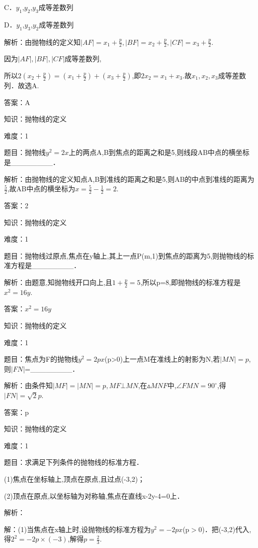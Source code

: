 \documentclass{article} %
\begin{document}
C．$y_{1}$,$y_{2}$,$y_{3}$成等差数列

D．$y_{1}$,$y_{3}$,$y_{2}$成等差数列

解析：由抛物线的定义知$|AF|=x_1+\frac{p}{2},|BF|=x_2+\frac{p}{2},|CF|=x_3+\frac{p}{2}$.

因为$|AF|,|BF|,|CF|$成等差数列,

所以$2(x_2+\frac{p}{2})=(x_1+\frac{p}{2})+(x_3+\frac{p}{2})$,即$2x_{2}=x_{1}+x_{3}$.故$x_{1},x_{2},x_{3}$成等差数列．故选A.

答案：A



知识：抛物线的定义

难度：1

题目：抛物线$y^{2}=2x$上的两点A,B到焦点的距离之和是5,则线段AB中点的横坐标是\_\_\_\_\_\_\_\_．

解析：由抛物线的定义知点A,B到准线的距离之和是5,则AB的中点到准线的距离为$\frac{5}{2}$,故AB中点的横坐标为$x=\frac{5}{2}-\frac{1}{2}=2$.

答案：2



知识：抛物线的定义

难度：1

题目：抛物线过原点,焦点在y轴上,其上一点P(m,1)到焦点的距离为5,则抛物线的标准方程是\_\_\_\_\_\_\_\_．

解析：由题意,知抛物线开口向上,且$1+\frac{p}{2}=5$,所以p=8,即抛物线的标准方程是$x^{2}=16y$.

答案：$x^{2}=16y$



知识：抛物线的定义

难度：1

题目：焦点为F的抛物线$y^{2}=2px$(p>0)上一点M在准线上的射影为N,若$|MN|=p$,则$|FN|$=\_\_\_\_\_\_\_\_．

解析：由条件知$|MF|=|MN|=p,MF\bot MN$,在$\vartriangle MNF$中,$\angle FMN=90^{\circ}$,得$|FN|=\sqrt{2}p$.

答案：p


知识：抛物线的定义

难度：1

题目：求满足下列条件的抛物线的标准方程．

(1)焦点在坐标轴上,顶点在原点,且过点(-3,2)；

(2)顶点在原点,以坐标轴为对称轴,焦点在直线x-2y-4=0上．

解析：

解：(1)当焦点在x轴上时,设抛物线的标准方程为$y^{2}=-2px$(p${>}$0)．把(-3,2)代入,得$2^{2}=-2p\times (-3)$,解得$p=\frac{2}{3}$.
\end{document}
